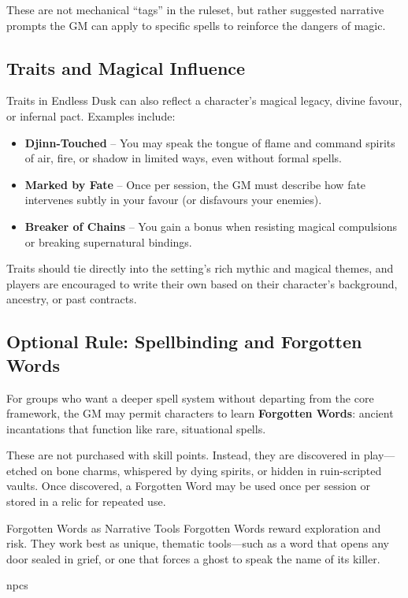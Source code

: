 These are not mechanical “tags” in the ruleset, but rather suggested narrative prompts the GM can apply to specific spells to reinforce the dangers of magic.

\subsection{Traits and Magical Influence}

Traits in Endless Dusk can also reflect a character’s magical legacy, divine favour, or infernal pact. Examples include:

\begin{itemize}\raggedright
    \item \textbf{Djinn-Touched} – You may speak the tongue of flame and command spirits of air, fire, or shadow in limited ways, even without formal spells.
    \item \textbf{Marked by Fate} – Once per session, the GM must describe how fate intervenes subtly in your favour (or disfavours your enemies).
    \item \textbf{Breaker of Chains} – You gain a bonus when resisting magical compulsions or breaking supernatural bindings.
\end{itemize}

Traits should tie directly into the setting’s rich mythic and magical themes, and players are encouraged to write their own based on their character’s background, ancestry, or past contracts.

\subsection{Optional Rule: Spellbinding and Forgotten Words}

For groups who want a deeper spell system without departing from the core framework, the GM may permit characters to learn \textbf{Forgotten Words}: ancient incantations that function like rare, situational spells.

These are not purchased with skill points. Instead, they are discovered in play—etched on bone charms, whispered by dying spirits, or hidden in ruin-scripted vaults. Once discovered, a Forgotten Word may be used once per session or stored in a relic for repeated use.

\begin{CommentBox}{Forgotten Words as Narrative Tools}
    Forgotten Words reward exploration and risk. They work best as unique, thematic tools—such as a word that opens any door sealed in grief, or one that forces a ghost to speak the name of its killer.
\end{CommentBox}


{npcs}

